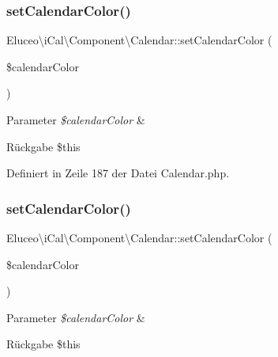 \subsubsection{\texorpdfstring{set\+Calendar\+Color()}{setCalendarColor()}\hspace{0.1cm}{\footnotesize\ttfamily [2/3]}}
{\footnotesize\ttfamily Eluceo\textbackslash{}i\+Cal\textbackslash{}\+Component\textbackslash{}\+Calendar\+::set\+Calendar\+Color (\begin{DoxyParamCaption}\item[{}]{\$calendar\+Color }\end{DoxyParamCaption})}


\begin{DoxyParams}{Parameter}
{\em \$calendar\+Color} & \\
\hline
\end{DoxyParams}
\begin{DoxyReturn}{Rückgabe}
\$this 
\end{DoxyReturn}


Definiert in Zeile 187 der Datei Calendar.\+php.

\mbox{\label{class_eluceo_1_1i_cal_1_1_component_1_1_calendar_ac77495dbc6d258d3a385026f267966c3}} 
\subsubsection{\texorpdfstring{set\+Calendar\+Color()}{setCalendarColor()}\hspace{0.1cm}{\footnotesize\ttfamily [3/3]}}
{\footnotesize\ttfamily Eluceo\textbackslash{}i\+Cal\textbackslash{}\+Component\textbackslash{}\+Calendar\+::set\+Calendar\+Color (\begin{DoxyParamCaption}\item[{}]{\$calendar\+Color }\end{DoxyParamCaption})}


\begin{DoxyParams}{Parameter}
{\em \$calendar\+Color} & \\
\hline
\end{DoxyParams}
\begin{DoxyReturn}{Rückgabe}
\$this 
\end{DoxyReturn}


